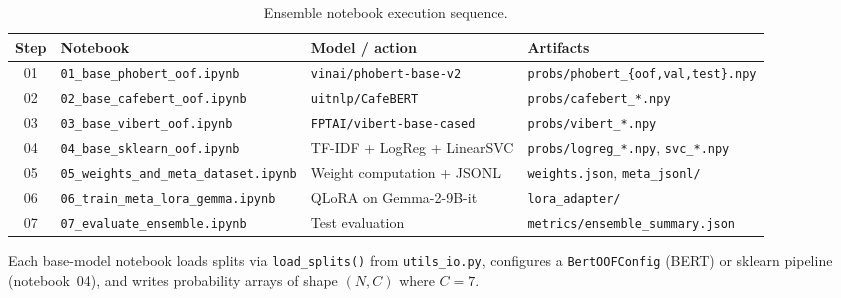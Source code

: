 \documentclass[11pt,a4paper]{article}
\newcommand{\repo}[1]{\texttt{#1}}
\begin{document}
\begin{table}[htbp]
  \centering
  \caption{Ensemble notebook execution sequence.}
  \label{tab:ensemble-notebooks}
  \small
  \begin{tabular}{@{}clll@{}}
    \toprule
    Step & Notebook & Model / action & Artifacts \\
    \midrule
    01 & \repo{01\_base\_phobert\_oof.ipynb} & \texttt{vinai/phobert-base-v2} & \repo{probs/phobert\_\{oof,val,test\}.npy} \\
    02 & \repo{02\_base\_cafebert\_oof.ipynb} & \texttt{uitnlp/CafeBERT} & \repo{probs/cafebert\_*.npy} \\
    03 & \repo{03\_base\_vibert\_oof.ipynb} & \texttt{FPTAI/vibert-base-cased} & \repo{probs/vibert\_*.npy} \\
    04 & \repo{04\_base\_sklearn\_oof.ipynb} & TF-IDF + LogReg + LinearSVC & \repo{probs/logreg\_*.npy}, \repo{svc\_*.npy} \\
    05 & \repo{05\_weights\_and\_meta\_dataset.ipynb} & Weight computation + JSONL & \repo{weights.json}, \repo{meta\_jsonl/} \\
    06 & \repo{06\_train\_meta\_lora\_gemma.ipynb} & QLoRA on Gemma-2-9B-it & \repo{lora\_adapter/} \\
    07 & \repo{07\_evaluate\_ensemble.ipynb} & Test evaluation & \repo{metrics/ensemble\_summary.json} \\
    \bottomrule
  \end{tabular}
\end{table}

Each base-model notebook loads splits via \texttt{load\_splits()} from \repo{utils\_io.py}, configures a \texttt{BertOOFConfig} (BERT) or sklearn pipeline (notebook~04), and writes probability arrays of shape $(N, C)$ where $C=7$.
\end{document}
